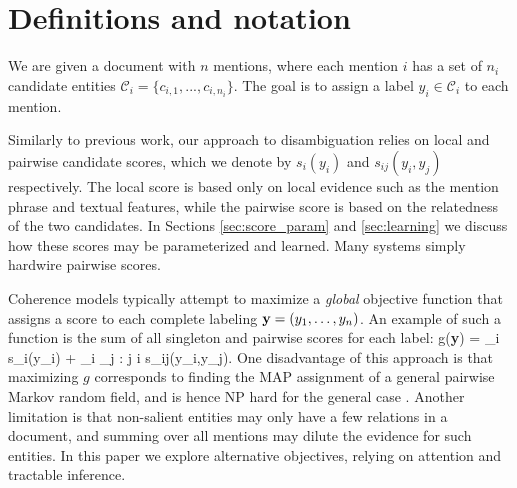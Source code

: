 \section{Definitions and notation}
\label{sec:notation}

We are given a document with $n$ mentions, where each mention $i$ has a set of $n_i$ candidate entities $\mathcal{C}_i = \{c_{i,1}, ..., c_{i,n_i}\}$. The goal is to assign a label $y_i \in \mathcal{C}_i$ to each mention.

Similarly to previous work, our approach to disambiguation relies on local and pairwise candidate scores, which we denote by $s_i(y_i)$ and $s_{ij}(y_i, y_j)$ respectively. The local score is based only on local evidence such as the mention phrase and textual features, while the pairwise score is based on the relatedness of the two candidates. 
In Sections \ref{sec:score_param} and \ref{sec:learning} we discuss how these scores may be parameterized and learned.  Many systems \cite{Cucerzan07,Milne2008,KulkarniSRC09} simply hardwire pairwise scores.


Coherence models typically attempt to maximize a {\em global} objective function that assigns a score to each complete labeling ${\bf y} = (y_1,\ldots, y_n)$. 
An example of such a function is the sum of all singleton and pairwise scores for each label:
\be
g({\bf y}) = \sum_i s_i(y_i) + \sum_i \sum_{j :  j \neq i} s_{ij}(y_i,y_j).
\label{eq:global_obj}
\ee 
One disadvantage of this approach is that maximizing $g$ corresponds to finding the MAP assignment of a general pairwise Markov random field, and is hence
NP hard for the general case \cite{wainwright2008graphical}. Another limitation is that non-salient entities may only have a few relations in a document, and summing over all mentions may dilute the evidence for such entities. In this paper we explore alternative objectives, relying on attention and tractable inference.



